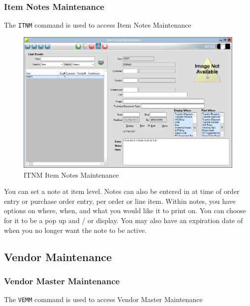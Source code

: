 \subsubsection{Item Notes Maintenance}


The \texttt{ITNM} command is used to access Item Notes Maintenance

\begin{figure}[H]
	\includegraphics[width=\textwidth]{../img/image66}
	\caption{ITNM Item Notes Maintenance}
\end{figure}

You can set a note at item level. Notes can also be entered in at time of order entry or purchase order entry, per order or line item. Within notes, you have options on where, when, and what you would like it to print on. You can choose for it to be a pop up and / or display. You may also have an expiration date of when you no longer want the note to be active.

\subsection{Vendor Maintenance}

\subsubsection{Vendor Master Maintenance}


The \texttt{VEMM} command is used to access Vendor Master Maintenance

